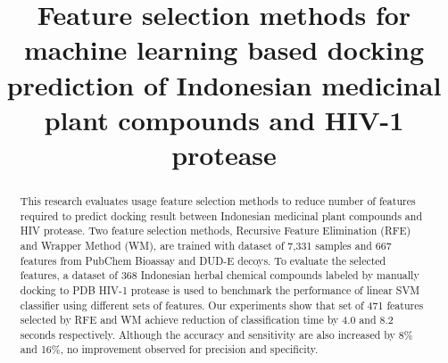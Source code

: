 \documentclass[conference,compsoc,12pt]{IEEEtran}
\begin{document}
\title{Feature selection methods for machine learning based docking prediction of Indonesian medicinal plant compounds and HIV-1 protease}



\author{
}

\maketitle

\begin{abstract}

This research evaluates usage feature selection methods to reduce number of features required to predict docking result between Indonesian medicinal plant compounds and HIV protease. Two feature selection methods, Recursive Feature Elimination (RFE) and Wrapper Method (WM), are trained with dataset of 7,331 samples and 667 features from PubChem Bioassay and DUD-E decoys. To evaluate the selected features, a dataset of 368 Indonesian herbal chemical compounds labeled by manually docking to PDB HIV-1 protease is used to benchmark the performance of linear SVM classifier using different sets of features. Our experiments show that set of 471 features selected by RFE and WM achieve reduction of classification time by 4.0 and 8.2 seconds respectively. Although the accuracy and sensitivity are also increased by 8\% and 16\%, no improvement observed for precision and specificity.  

\end{abstract}
\end{document}
